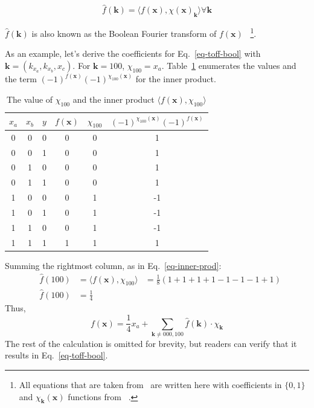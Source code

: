 \begin{equation}
  \label{eq-fhat-prod}
  \hat{f}(\mathbf{k}) = \langle f(\mathbf{x}), \chi(\mathbf{x})_{\mathbf{k}} \rangle \forall \mathbf{k} 
\end{equation}

$\hat{f}(\mathbf{k})$ is also known as the Boolean Fourier transform of $f(\mathbf{x})$~\cite{bib-odonnell}
\footnote{All equations that are taken from~\cite{bib-odonnell} are written here
with coefficients in $\{0,1\}$ and $\chi_{\mathbf{k}}(\mathbf{x})$ functions from ~\cite{bib-amy-matroid}.}.
\begin{example}
  As an example, let's derive the coefficients for Eq.~\ref{eq-toff-bool} with
  $\mathbf{k} = (k_{x_a}, k_{x_b}, x_c)$.
  For $\mathbf{k} = 100$, $\chi_{100} = x_a$. Table~\ref{table-ex-100} enumerates the values and the term
  $(-1)^{f(\mathbf{x})} (-1)^{\chi_{100}(\mathbf{x})}$ for the inner product.
\begin{table}[h]
  \begin{center}
    \begin{tabular}{c|c|c|c|c|c}
      \hline
      $x_a$ & $x_b$ & $y$ & $f(\mathbf{x})$ & $\chi_{100}$ & $(-1)^{\chi_{100}(\mathbf{x})} (-1)^{f(\mathbf{x})}$ \\\hline
      0 & 0 & 0 & 0 & 0 & 1\\\hline
      0 & 0 & 1 & 0 & 0 & 1\\\hline
      0 & 1 & 0 & 0 & 0 & 1\\\hline
      0 & 1 & 1 & 0 & 0 & 1\\\hline
      1 & 0 & 0 & 0 & 1 & -1\\\hline
      1 & 0 & 1 & 0 & 1 & -1\\\hline
      1 & 1 & 0 & 0 & 1 & -1\\\hline      
      1 & 1 & 1 & 1 & 1 & 1\\\hline
    \end{tabular}
    \caption{The value of $\chi_{100}$ and the inner product $\langle f(\mathbf{x}), \chi_{100} \rangle$}
    \label{table-ex-100}
  \end{center}
\end{table}

Summing the rightmost column, as in Eq.~\ref{eq-inner-prod}:
\begin{align}
  &\hat{f}(100) &= \langle f(\mathbf{x}), \chi_{100} \rangle &= \frac{1}{8} ( 1 + 1 + 1 + 1 - 1 - 1 - 1 + 1 ) \\
  &\hat{f}(100) &= \frac{1}{4}\nonumber
\end{align}
Thus,
\begin{equation}
  f(\mathbf{x}) = \frac{1}{4}x_a + \sum_{\mathbf{k} \neq 000,100} \hat{f}(\mathbf{k}) \cdot \chi_{\mathbf{k}}
\end{equation}
The rest of the calculation is omitted for brevity, but readers can verify that it results in Eq.~\ref{eq-toff-bool}.
\end{example}

